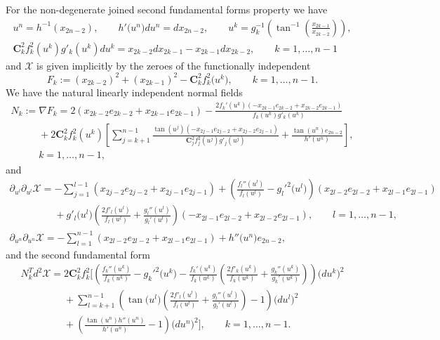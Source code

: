 \documentclass[11pt]{article}
\begin{document}
For the non-degenerate joined second fundamental forms property we
have
\begin{gather*}
u^n=h^{-1}(x_{2n-2}),\qquad h'\big(u^n\big)du^n=dx_{2n-2},\qquad
u^k=g_k^{-1}\left(\tan^{-1}\left(\frac{x_{2k-1}}{x_{2k-2}}\right)\right),
\\
\mathbf{C}_k^2f_k^2(u^k)g'_k(u^k)du^k=x_{2k-2}dx_{2k-1}-x_{2k-1}dx_{2k-2},
\qquad k=1,\dots ,n-1
\end{gather*}
and $\mathcal{X}$ is given implicitly by the zeroes of the
functionally independent
\[
F_k:=(x_{2k-2})^2+(x_{2k-1})^2-\mathbf{C}_k^2f_k^2\big(u^k\big),\qquad
k=1,\dots ,n-1.
\]
We have the natural linearly independent normal f\/ields
\begin{gather*}
N_k:=\nabla F_k=2(x_{2k-2}e_{2k-2}+x_{2k-1}e_{2k-1})
-\frac{2f_k'(u^k)(-x_{2k-1}e_{2k-2}+x_{2k-2}e_{2k-1})}{f_k(u^k)g'_k(u^k)}
\\
\phantom{N_k:=}{} +2\mathbf{C}_k^2f_k^2(u^k)\left[\sum_{j=k+1}^{n-1}\frac{\tan(u^j)
(-x_{2j-1}e_{2j-2}+x_{2j-2}e_{2j-1})}
{\mathbf{C}_j^2f_j^2(u^j)g'_j(u^j)}+\frac{\tan(u^n)e_{2n-2}}{h'(u^n)}\right],\\
\phantom{N_k:=}{} k=1,\dots ,n-1,
\end{gather*} and
\begin{gather*}
\partial_{u^l}\partial_{u^l}\mathcal{X}=-\sum_{j=1}^{l-1}(x_{2j-2}e_{2j-2}+x_{2j-1}e_{2j-1})
+\left(\frac{f_l''(u^l)}{f_l(u^l)}-g_l'^2\big(u^l\big)\right)(x_{2l-2}e_{2l-2}+x_{2l-1}e_{2l-1})
\\
\phantom{\partial_{u^l}\partial_{u^l}\mathcal{X}=}{} +g'_l\big(u^l\big)\left(\frac{2f'_l(u^l)}{f_l(u^l)}+\frac{g_l''(u^l)}{g_l'(u^l)}\right)
(-x_{2l-1}e_{2l-2}+x_{2l-2}e_{2l-1}),\qquad l=1,\dots ,n-1,
\\
\partial_{u^n}\partial_{u^n}\mathcal{X}=-\sum_{l=1}^{n-1}(x_{2l-2}e_{2l-2}+x_{2l-1}e_{2l-1})
+h''\big(u^n\big)e_{2n-2},
\end{gather*}
and the second fundamental form
\begin{gather*}
N_k^Td^2\mathcal{X}=2\mathbf{C}_k^2f_k^2\Bigg[\left(\frac{f_k''(u^k)}{f_k(u^k)}-g_k'^2\big(u^k\big)
-\frac{f_k'(u^k)}{f_k(u^k)}\left(\frac{2f'_k(u^k)}{f_k(u^k)}+
\frac{g_k''(u^k)}{g_k'(u^k)}\right)\right)\big(du^k\big)^2
\\
\phantom{N_k^Td^2\mathcal{X}=}{}
+\sum_{l=k+1}^{n-1}\left(\tan\big(u^l\big)\left(\frac{2f'_l(u^l)}{f_l(u^l)}
+\frac{g_l''(u^l)}{g_l'(u^l)}\right)-1\right)\big(du^l\big)^2\\
\phantom{N_k^Td^2\mathcal{X}=}{}
+\left(\frac{\tan(u^n)h''(u^n)}{h'(u^n)}-1\right)\big(du^n\big)^2\Bigg],\qquad k=1,\dots ,n-1.
\end{gather*}
\end{document}
